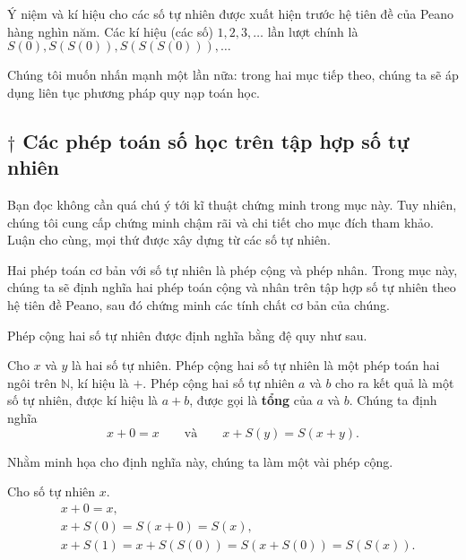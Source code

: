Ý niệm và kí hiệu cho các số tự nhiên được xuất hiện trước hệ tiên đề của Peano hàng nghìn năm. Các kí hiệu (các số) $1, 2, 3,\ldots$ lần lượt chính là $S(0), S(S(0)), S(S(S(0))),\ldots$

Chúng tôi muốn nhấn mạnh một lần nữa: trong hai mục tiếp theo, chúng ta sẽ áp dụng liên tục phương pháp quy nạp toán học.

\subsection{$\dagger$ Các phép toán số học trên tập hợp số tự nhiên}

Bạn đọc không cần quá chú ý tới kĩ thuật chứng minh trong mục này. Tuy nhiên, chúng tôi cung cấp chứng minh chậm rãi và chi tiết cho mục đích tham khảo. Luận cho cùng, mọi thứ được xây dựng từ các số tự nhiên.

Hai phép toán cơ bản với số tự nhiên là phép cộng và phép nhân. Trong mục này, chúng ta sẽ định nghĩa hai phép toán cộng và nhân trên tập hợp số tự nhiên theo hệ tiên đề Peano, sau đó chứng minh các tính chất cơ bản của chúng.

Phép cộng hai số tự nhiên được định nghĩa bằng đệ quy như sau.

\begin{definition}
	Cho $x$ và $y$ là hai số tự nhiên. Phép cộng hai số tự nhiên là một phép toán hai ngôi trên $\mathbb{N}$, kí hiệu là $+$. Phép cộng hai số tự nhiên $a$ và $b$ cho ra kết quả là một số tự nhiên, được kí hiệu là $a + b$, được gọi là \textbf{tổng} của $a$ và $b$. Chúng ta định nghĩa
	\[
		x + 0 = x\qquad\text{và}\qquad x + S(y) = S(x + y).
	\]
\end{definition}

Nhằm minh họa cho định nghĩa này, chúng ta làm một vài phép cộng.
\begin{example}
	Cho số tự nhiên $x$.
	\begin{align*}
		 & x + 0 = x,                                      \\
		 & x + S(0) = S(x + 0) = S(x),                     \\
		 & x + S(1) = x + S(S(0)) = S(x + S(0)) = S(S(x)).
	\end{align*}
\end{example}

